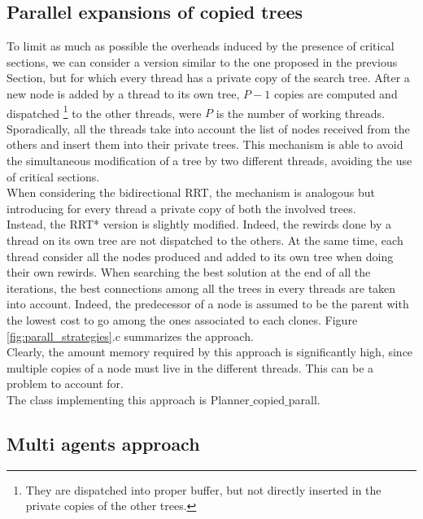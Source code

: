 \subsection{Parallel expansions of copied trees}
\label{sec:strtg_copied}

To limit as much as possible the overheads induced by the presence of critical sections, we can consider a version similar to the one proposed in the previous Section, but for which every thread has a private copy of the search tree. After a new node is added by a thread to its own tree, $P-1$ copies are computed and dispatched \footnote{They are dispatched into proper buffer, but not directly inserted in the private copies of the other trees.} to the other threads, were $P$ is the number of working threads.
Sporadically, all the threads take into account the list of nodes received from the others and insert them into their private trees. This mechanism is able to avoid the simultaneous modification of a tree by two different threads, avoiding the use of critical sections.
\\
When considering the bidirectional RRT, the mechanism is analogous but introducing for every thread a private
copy of both the involved trees. 
\\
Instead, the RRT* version is slightly modified. Indeed, the rewirds done by a thread on its own tree are not dispatched to the others.
At the same time, each thread consider all the nodes produced and added to its own tree when doing their own rewirds.
When searching the best solution at the end of all the iterations, the best connections among all the trees in every threads are taken into account. Indeed, the predecessor of a node is assumed to be the parent with the lowest cost to go among the ones associated to each clones. Figure \ref{fig:parall_strategies}.c summarizes the approach.
\\
Clearly, the amount memory required by this approach is significantly high, since multiple copies of a node must live in the different threads.
This can be a problem to account for.
\\
The class implementing this approach is Planner$\_$copied$\_$parall.
 


\subsection{Multi agents approach}
\label{sec:strtg_multi}

